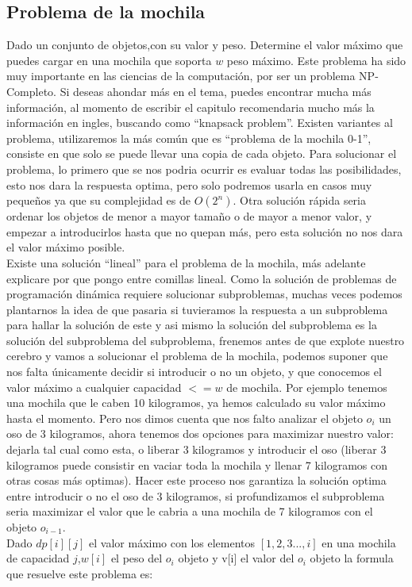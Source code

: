 \subsection{Problema de la mochila}
Dado un conjunto de objetos,con su valor y peso. Determine el valor máximo que puedes cargar en una mochila que soporta $w$ peso máximo.
Este problema ha sido muy importante en las ciencias de la computación, por ser un problema NP-Completo. Si deseas ahondar más en el tema, puedes encontrar mucha más información, al momento de escribir el capitulo recomendaria mucho más la información en ingles, buscando como ``knapsack problem''. Existen variantes al problema, utilizaremos la más común que es ``problema de la mochila 0-1'', consiste en que solo se puede llevar una copia de cada objeto.
Para solucionar el problema, lo primero que se nos podria ocurrir es evaluar todas las posibilidades, esto nos dara la respuesta optima, pero solo podremos usarla en casos muy pequeños ya que su complejidad es de $O(2^n)$. Otra solución rápida seria ordenar los objetos de menor a mayor tamaño o de mayor a menor valor, y empezar a introducirlos hasta que no quepan más,  pero esta solución no nos dara el valor máximo posible.
\\Existe una solución ``lineal'' para el problema de la mochila, más adelante explicare por que pongo entre comillas lineal. Como la solución de problemas de programación dinámica requiere solucionar subproblemas, muchas veces podemos plantarnos la idea de que pasaria si tuvieramos la respuesta a un subproblema para hallar la solución de este y asi mismo la solución del subproblema es la solución del subproblema del subproblema, frenemos antes de que explote nuestro cerebro y vamos a solucionar el problema de la mochila, podemos suponer que nos falta únicamente decidir si introducir o no un objeto, y que conocemos el valor máximo a cualquier capacidad $<=w$ de mochila. Por ejemplo tenemos una mochila que le caben 10 kilogramos, ya hemos calculado su valor máximo hasta el momento. Pero nos dimos cuenta que nos falto analizar el objeto $o_i$ un oso de 3 kilogramos, ahora tenemos dos opciones para maximizar nuestro valor: dejarla tal cual como esta, o liberar 3 kilogramos y introducir el oso (liberar 3 kilogramos puede consistir en vaciar toda la mochila y llenar 7 kilogramos con otras cosas más optimas). Hacer este proceso nos garantiza la solución optima entre introducir o no el oso de 3 kilogramos, si profundizamos el subproblema seria maximizar el valor que le cabria a una mochila de 7 kilogramos con el objeto $o_{i-1}$.
\\Dado $dp[i][j]$ el valor máximo con los elementos $[1,2,3...,i]$ en una mochila de capacidad $j$,$w[i]$ el peso del $o_i$ objeto y v[i] el valor del $o_i$ objeto la formula que resuelve este problema es:

